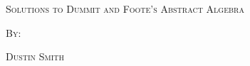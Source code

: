 \documentclass[dvipsnames]{scrbook}%
\begin{document}
\frontmatter
\begin{center}
  \begin{center}
  \vspace*{\fill}
  \textsc{\LARGE Solutions to Dummit and Foote's Abstract Algebra}
  \par\bigskip
  \textsc{By:}
  \par\bigskip
  \textsc{\LARGE Dustin Smith}
  \vspace*{\fill}
\end{center}
\end{center}

\tableofcontents

\mainmatter
%
%
\end{document}
